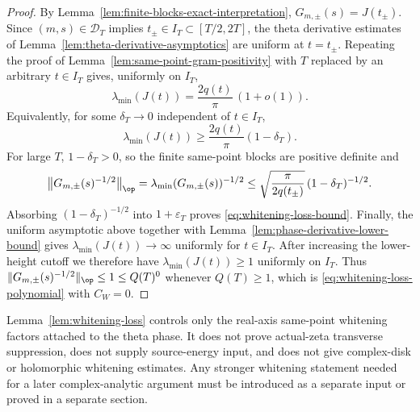 \begin{proof}
By Lemma~\ref{lem:finite-blocks-exact-interpretation},
\(G_{m,\pm}(s)=J(t_\pm)\).  Since \((m,s)\in\mathcal D_T\) implies
\(t_\pm\in I_T\subset[T/2,2T]\), the theta derivative estimates of
Lemma~\ref{lem:theta-derivative-asymptotics} are uniform at \(t=t_\pm\).
Repeating the proof of Lemma~\ref{lem:same-point-gram-positivity} with
\(T\) replaced by an arbitrary \(t\in I_T\) gives, uniformly on \(I_T\),
\[
        \lambda_{\min}(J(t))
        =\frac{2q(t)}{\pi}\,(1+o(1)).
\]
Equivalently, for some \(\delta_T\to0\) independent of \(t\in I_T\),
\[
        \lambda_{\min}(J(t))
        \ge \frac{2q(t)}{\pi}(1-\delta_T).
\]
For large \(T\), \(1-\delta_T>0\), so the finite same-point blocks are
positive definite and
\[
        \bigl\|G_{m,\pm}(s)^{-1/2}\bigr\|_{\op}
        =\lambda_{\min}(G_{m,\pm}(s))^{-1/2}
        \le
        \sqrt{\frac{\pi}{2q(t_\pm)}}\,(1-\delta_T)^{-1/2}.
\]
Absorbing \((1-\delta_T)^{-1/2}\) into \(1+\varepsilon_T\) proves
\eqref{eq:whitening-loss-bound}.  Finally, the uniform asymptotic above together with
Lemma~\ref{lem:phase-derivative-lower-bound} gives
\(\lambda_{\min}(J(t))\to\infty\) uniformly for \(t\in I_T\).  After
increasing the lower-height cutoff we therefore have
\(\lambda_{\min}(J(t))\ge1\) uniformly on \(I_T\).  Thus
\(\|G_{m,\pm}(s)^{-1/2}\|_{\op}\le1\le Q(T)^0\) whenever \(Q(T)\ge1\),
which is \eqref{eq:whitening-loss-polynomial} with \(C_W=0\).
\end{proof}

\begin{remark}
\label{rem:whitening-loss-scope}
Lemma~\ref{lem:whitening-loss} controls only the real-axis same-point
whitening factors attached to the theta phase.  It does not prove
actual-zeta transverse suppression, does not supply source-energy input,
and does not give complex-disk or holomorphic whitening estimates.  Any
stronger whitening statement needed for a later complex-analytic argument
must be introduced as a separate input or proved in a separate section.
\end{remark}
